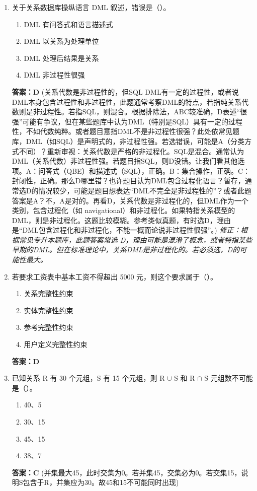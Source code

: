 \documentclass[12pt, a4paper]{article}
\begin{document}
\begin{enumerate}[label=\arabic*.]
    \item 关于关系数据库操纵语言 DML 叙述，错误是（\quad）。
    \begin{enumerate}
        \item DML 有问答式和语言描述式
        \item DML 以关系为处理单位
        \item DML 处理后结果是关系
        \item DML 非过程性很强
    \end{enumerate}
    \textbf{答案：D} (关系代数是非过程性的，但SQL DML有一定的过程性，或者说DML本身包含过程性和非过程性，此题通常考察DML的特点，若指纯关系代数则是非过程性。若指SQL，则混合。根据排除法，ABC较准确，D表述“很强”可能有争议，但在某些题库中认为DML（特别是SQL）具有一定的过程性，不如代数纯粹。或者题目意指DML不是非过程性很强？此处依常见题库，DML（如SQL）是声明式的，非过程性强。若选错误，可能是A（分类方式不同）？重新审视：关系代数是严格的非过程化。SQL是混合。通常认为DML（关系代数）非过程性强。若题目指SQL，则D没错。让我们看其他选项。A：问答式（QBE）和描述式（SQL），正确。B：集合操作，正确。C：封闭性，正确。那么D哪里错？也许题目认为DML包含过程化语言？暂存，通常选D的情况较少，可能是题目想表达“DML不完全是非过程性的”？或者此题答案是A？不，A是对的。再看D，关系代数是非过程化的，但DML作为一个类别，包含过程化（如 navigational）和非过程化。如果特指关系模型的DML，则是非过程化。这题比较模糊。参考类似真题，有时选D，理由是“DML包含过程化和非过程化，不能一概而论说非过程性很强”。)
    \textit{修正：根据常见专升本题库，此题答案常选 D，理由可能是混淆了概念，或者特指某些早期的DML。但在标准理论中，关系DML是非过程化的。若必须选，D的可能性最大。}

    \item 若要求工资表中基本工资不得超出 5000 元，则这个要求属于（\quad）。
    \begin{enumerate}
        \item 关系完整性约束
        \item 实体完整性约束
        \item 参考完整性约束
        \item 用户定义完整性约束
    \end{enumerate}
    \textbf{答案：D}

    \item 已知关系 R 有 30 个元组，S 有 15 个元组，则 R $\cup$ S 和 R $\cap$ S 元组数不可能是（\quad）。
    \begin{enumerate}
        \item 40、5
        \item 30、15
        \item 45、15
        \item 38、7
    \end{enumerate}
    \textbf{答案：C} (并集最大45，此时交集为0。若并集45，交集必为0。若交集15，说明S包含于R，并集应为30。故45和15不可能同时出现)


\end{enumerate}
\end{document}
